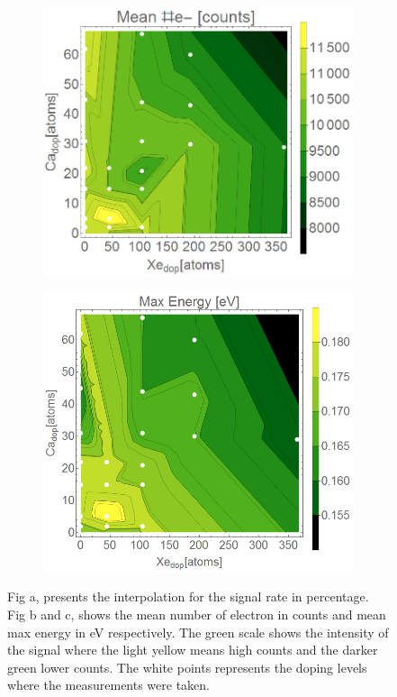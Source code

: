 \begin{figure}[h!]
\begin{subfigure}[l]{0.49\textwidth}\caption{}
\includegraphics[width=1\textwidth]{../Images/results/MIR_He_XeCaDop/interpolationE2.png}   		
\end{subfigure}
\begin{subfigure}[l]{0.49\textwidth}\caption{}
\includegraphics[width=1\textwidth]{../Images/results/MIR_He_XeCaDop/interpolationMax2.png}   	
	\end{subfigure}
\caption[MIR He-Xe-Ca doping. Interpolations]{Fig a, presents the interpolation for the signal rate in percentage. Fig b and c, shows the  mean number of electron in counts and mean max energy in eV respectively. The green scale shows the intensity of the signal where the light yellow means high counts and the darker green lower counts. The white points represents the doping levels where the measurements were taken.}
\label{fig:XeCainterpolation}
\end{figure}

